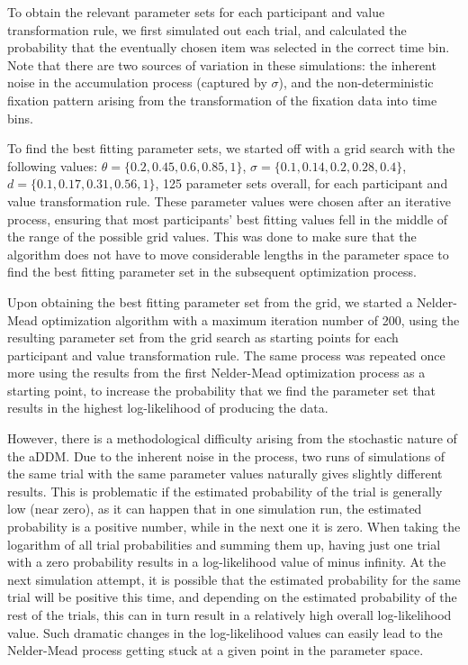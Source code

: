 \documentclass[11pt,a4paper]{article}
\begin{document}
To obtain the relevant parameter sets for each participant and value transformation rule, we first simulated out each trial, and calculated the probability that the eventually chosen item was selected in the correct time bin. Note that there are two sources of variation in these simulations: the inherent noise in the accumulation process (captured by $\sigma$), and the non-deterministic fixation pattern arising from the transformation of the fixation data into time bins. 


To find the best fitting parameter sets, we started off with a grid search with the following values: $\theta=\{0.2, 0.45, 0.6, 0.85, 1\}$, $\sigma=\{0.1, 0.14, 0.2, 0.28, 0.4\}$, $\textit{d}=\{0.1, 0.17, 0.31, 0.56, 1\}$, 125 parameter sets overall, for each participant and value transformation rule. These parameter values were chosen after an iterative process, ensuring that most participants' best fitting values fell in the middle of the range of the possible grid values. This was done to make sure that the algorithm does not have to move considerable lengths in the parameter space to find the best fitting parameter set in the subsequent optimization process.


Upon obtaining the best fitting parameter set from the grid, we started a Nelder-Mead optimization algorithm with a maximum iteration number of 200, using the resulting parameter set from the grid search as starting points for each participant and value transformation rule. The same process was repeated once more using the results from the first Nelder-Mead optimization process as a starting point, to increase the probability that we find the parameter set that results in the highest log-likelihood of producing the data. 

However, there is a methodological difficulty arising from the stochastic nature of the aDDM. Due to the inherent noise in the process, two runs of simulations of the same trial with the same parameter values naturally gives slightly different results. This is problematic if the estimated probability of the trial is generally low (near zero), as it can happen that in one simulation run, the estimated probability is a positive number, while in the next one it is zero. When taking the logarithm of all trial probabilities and summing them up, having just one trial with a zero probability results in a log-likelihood value of minus infinity. At the next simulation attempt, it is possible that the estimated probability for the same trial will be positive this time, and depending on the estimated probability of the rest of the trials, this can in turn result in a relatively high overall log-likelihood value. Such dramatic changes in the log-likelihood values can easily lead to the Nelder-Mead process getting stuck at a given point in the parameter space.
\end{document}
